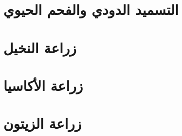 \documentclass[12pt,a4paper]{report}
\begin{document}
\chapter{التسميد الدودي والفحم الحيوي}









\chapter{زراعة النخيل}









\chapter{زراعة الأكاسيا}









\chapter{زراعة الزيتون}








\end{document}
